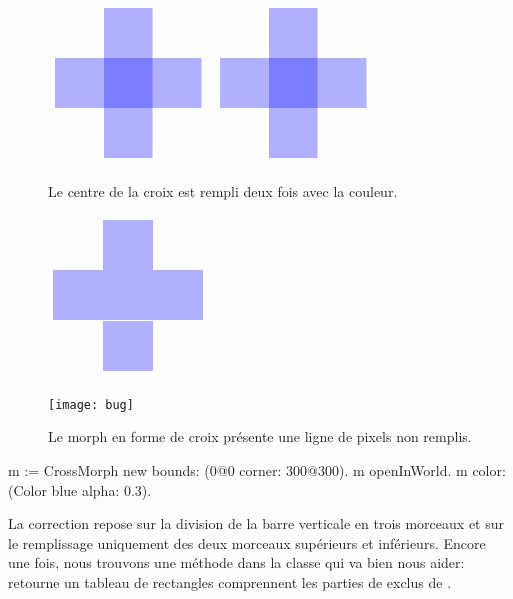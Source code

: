 \documentclass[a4paper,10pt,twoside]{book}
\begin{document}
\begin{figure}[t]
\begin{minipage}{0.48\textwidth}
	\ifluluelse
		{\centerline{\includegraphics[scale=0.6]{overdrawBug}}}
		{\centerline{\includegraphics{overdrawBug}}}
	\caption{Le centre de la croix est rempli deux fois avec la
      couleur.	\label{fig:overdrawBug}}
\end{minipage}
\hfill
\begin{minipage}{0.48\textwidth}
	\ifluluelse
		{\centerline{\includegraphics[scale=0.6]{hairlineBug}}}
		{\centerline{\texttt{[image: bug]}}}
	\caption{Le morph en forme de croix pr\'esente une ligne de pixels
      non remplis.	\label{fig:bug}}
\end{minipage}
\end{figure}


\begin{code}{}
m := CrossMorph new bounds: (0@0 corner: 300@300).
m openInWorld.
m color: (Color blue alpha: 0.3).

\end{code}

\noindent
La correction repose sur la division de la barre verticale en trois
morceaux et sur le remplissage uniquement des deux morceaux
sup\'erieurs et inf\'erieurs.
Encore une fois, nous trouvons une m\'ethode dans la classe
 qui va bien nous aider:  
retourne un tableau de rectangles comprennent les parties de 
exclus de . 
\end{document}
